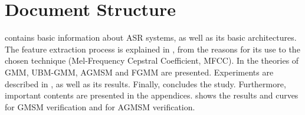 \section{Document Structure}

 contains basic information about ASR systems, as well as its basic architectures. The feature extraction process is explained in , from the reasons for its use to the chosen technique (Mel-Frequency Cepstral Coefficient, MFCC). In  the theories of GMM, UBM-GMM, AGMSM and FGMM are presented. Experiments are described in , as well as its results. Finally,  concludes the study. Furthermore, important contents are presented in the appendices.  shows the results and curves for GMSM verification and  for AGMSM verification.